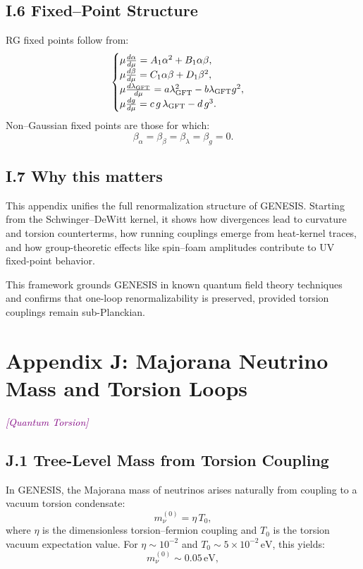 \documentclass{article}
\newcommand{\quantumtag}{\textcolor{purple}{\textit{[Quantum Torsion]}}}
\begin{document}
\subsection*{I.6 Fixed–Point Structure }
RG fixed points follow from:
\begin{equation}\label{eq:auto215}
\begin{cases}
  \mu\frac{d\alpha}{d\mu}
    =A_1\alpha^2 + B_1\alpha\beta,\\
  \mu\frac{d\beta}{d\mu}
    =C_1\alpha\beta + D_1\beta^2,\\
  \mu\frac{d\lambda_{\rm GFT}}{d\mu}
    =a\lambda_{\rm GFT}^2 - b\lambda_{\rm GFT}g^2,\\
  \mu\frac{dg}{d\mu}
    =c\,g\,\lambda_{\rm GFT} - d\,g^3.
\end{cases}
\end{equation}
Non–Gaussian fixed points are those for which:
\begin{equation}\label{eq:auto216}
\beta_\alpha=\beta_\beta=\beta_\lambda=\beta_g=0.
\end{equation}

\subsection*{I.7 Why this matters}
\begin{tcolorbox}[colback=gray!5, colframe=black!30, title=Why this matters]
This appendix unifies the full renormalization structure of GENESIS. Starting from the Schwinger–DeWitt kernel, it shows how divergences lead to curvature and torsion counterterms, how running couplings emerge from heat-kernel traces, and how group-theoretic effects like spin–foam amplitudes contribute to UV fixed-point behavior.

This framework grounds GENESIS in known quantum field theory techniques and confirms that one-loop renormalizability is preserved, provided torsion couplings remain sub-Planckian.
\end{tcolorbox}



\section*{Appendix J: Majorana Neutrino Mass and Torsion Loops}
\label{app:neutrino-loop}
\quantumtag

\subsection*{J.1 Tree-Level Mass from Torsion Coupling}
In GENESIS, the Majorana mass of neutrinos arises naturally from coupling to a vacuum torsion condensate:
\begin{equation}
m_\nu^{(0)} = \eta\,T_0,
\end{equation}
where $\eta$ is the dimensionless torsion–fermion coupling and $T_0$ is the torsion vacuum expectation value. For $\eta \sim 10^{-2}$ and $T_0 \sim 5 \times 10^{-2}$\,$\mathrm{eV}$, this yields:
\begin{equation}\label{eq:auto217}
m_\nu^{(0)} \sim 0.05\,\text{eV},
\end{equation}
\end{document}
